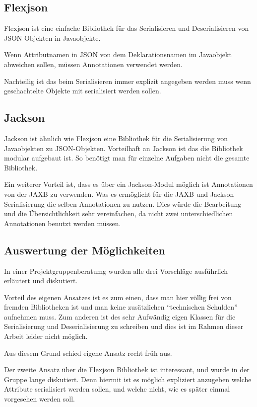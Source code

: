 \subsection{Flexjson}
Flexjson ist eine einfache Bibliothek f\"ur das Serialisieren und Deserialisieren von \ac{JSON}-Objekten in Javaobjekte.

Wenn Attributnamen in \ac{JSON} von dem Deklarationsnamen im Javaobjekt abweichen sollen, m\"ussen Annotationen verwendet werden.

Nachteilig ist das beim Serialisieren immer explizit angegeben werden muss wenn geschachtelte Objekte mit serialisiert werden sollen.
\subsection{Jackson}
Jackson ist \"ahnlich wie Flexjson eine Bibliothek f\"ur die Serialisierung von Javaobjekten zu \ac{JSON}-Objekten. Vorteilhaft an Jackson ist das die Bibliothek modular aufgebaut ist. So ben\"otigt man f\"ur einzelne Aufgaben nicht die gesamte Bibliothek.

Ein weiterer Vorteil ist, dass es \"uber ein Jackson-Modul m\"oglich ist Annotationen von der \ac{JAXB} zu verwenden. Was es erm\"oglicht f\"ur die \ac{JAXB} und Jackson Serialisierung die selben Annotationen zu nutzen. Dies w\"urde die Bearbeitung und die \"Ubersichtlichkeit sehr vereinfachen, da nicht zwei unterschiedlichen Annotationen benutzt werden m\"ussen.
\subsection{Auswertung der M\"oglichkeiten}
In einer Projektgruppenberatumg wurden alle drei Vorschl\"age ausf\"uhrlich erl\"autert und diskutiert. 

Vorteil des eigenen Ansatzes ist es zum einen, dass man hier v\"ollig frei von fremden Bibliotheken ist und man keine zus\"atzlichen "`technischen Schulden"' aufnehmen muss. Zum anderen ist des sehr Aufw\"andig eigen Klassen f\"ur die Serialisierung und Deserialisierung zu schreiben und dies ist im Rahmen dieser Arbeit leider nicht m\"oglich.

Aus diesem Grund schied eigene Ansatz recht fr\"uh aus.

Der zweite Ansatz \"uber die Flexjson Bibliothek ist interessant, und wurde in der Gruppe lange diskutiert. Denn hiermit ist es m\"oglich expliziert anzugeben welche Attribute serialisiert werden sollen, und welche nicht, wie es sp\"ater einmal vorgesehen werden soll.

